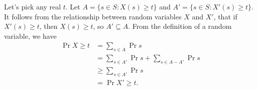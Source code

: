 \starred
Let's pick any real $t$.
Let $A=\{s\in S:X(s)\ge t\}$ and $A'=\{s\in S:X'(s)\ge t\}$.
It follows from the relationship between random variables $X$ and $X'$, that if $X'(s)\ge t$, then $X(s)\ge t$, so $A'\subseteq A$.
From the definition of a random variable, we have
\begin{align*}
    \Pr{X\ge t} &= \sum_{s\in A}\Pr{s} \\
    &= \sum_{s\in A'}\Pr{s}+\sum_{s\in A-A'}\Pr{s} \\
    &\ge \sum_{s\in A'}\Pr{s} \\
    &= \Pr{X'\ge t}.
\end{align*}
